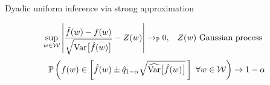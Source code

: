 \documentclass{beamer}
\begin{document}
\begin{frame}{Dyadic uniform inference via strong approximation}

  \vspace*{2mm}
  \begin{theorem}
    \vspace*{-3mm}
    \small{
      \begin{align*}
        \sup_{w \in \mathcal{W}}
        \left|
        \frac{\hat f(w) - f(w)}{\sqrt{\mathrm{Var}\big[\hat f(w)\big]}}
        - Z(w)
        \right|
        &\to_{\mathbb{P}} 0,
        &&Z(w) \text{ Gaussian process}
      \end{align*}
    }
    \vspace*{-4mm}
    \small{
      \begin{align*}
        \mathbb{P}\left(
          f(w)
          \in
          \left[
            \hat f(w)
            \pm
            \hat q_{1-\alpha}
            \sqrt{\widehat{\mathrm{Var}}\big[\hat f(w)\big]}
          \,\right] \
          \forall w \in \mathcal{W}
        \right)
        \to
        1 - \alpha
      \end{align*}
    }
    \vspace*{-5mm}
  \end{theorem}


\end{frame}
\end{document}

